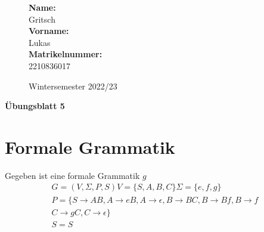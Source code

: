 \documentclass[10pt,ngerman]{scrartcl}
\begin{document}
\begin{figure}[htbp]
\begin{minipage}[b]{0.50\linewidth}
\begin{Large}

	\textbf{Name:}\\
	Gritsch 			\\
	\textbf{Vorname:}\\
	Lukas 				\\
	\textbf{Matrikelnummer:}\\
	2210836017

\end{Large}
\end{minipage}
\begin{minipage}[b]{0.50\linewidth}
\begin{flushright}
\begin{Huge}
\end{Huge}
\vspace{10px}
\begin{large}
Wintersemester 2022/23
\end{large}
\end{flushright}
\end{minipage}
\end{figure}

\vspace{20px}
\begin{huge}
\noindent

\textbf{Übungsblatt 5}
\end{huge}

\pagebreak
\section{Formale Grammatik}
Gegeben ist eine formale Grammatik $g$
\begin{align*}
 G=(V,\Sigma,P,S) V=\{S,A,B,C\} \Sigma = \{e,f,g\}\\
 P = \{ S \longrightarrow AB , A \longrightarrow eB, A \longrightarrow \epsilon , B \longrightarrow BC, B \longrightarrow Bf, B \longrightarrow f \\
 C \longrightarrow gC , C \longrightarrow \epsilon\}\\
 S=S
\end{align*}
\end{document}
